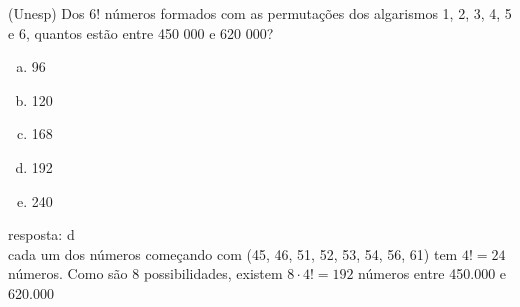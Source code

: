 \begin{ex}
  (Unesp) Dos 6! números formados com as permutações dos algarismos 1, 2, 3, 4, 5 e 6, quantos estão entre 450 000 e 620 000?
    \begin{enumerate}  [(a)]
        \item 96
        \item 120
        \item 168
        \item 192
        \item 240
    \end{enumerate}
     \begin{sol}
      resposta: d \\
    cada um dos  números começando com (45, 46, 51, 52, 53, 54, 56, 61) tem $4!=24$ números. Como são 8 possibilidades, existem $8\cdot4!=192$ números entre 450.000 e 620.000
     \end{sol}
 \end{ex}